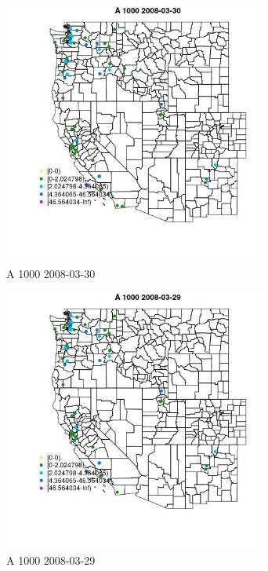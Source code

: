 \begin{figure} 
\centering  
\includegraphics[width=0.77\textwidth]{Code_Outputs/Report_ML_input_PM25_Step4_part_e_de_duplicated_aves_MapObsA_10002008-03-30.jpg} 
\caption{\label{fig:Report_ML_input_PM25_Step4_part_e_de_duplicated_avesMapObsA_10002008-03-30}A 1000 2008-03-30} 
\end{figure} 
 

\begin{figure} 
\centering  
\includegraphics[width=0.77\textwidth]{Code_Outputs/Report_ML_input_PM25_Step4_part_e_de_duplicated_aves_MapObsA_10002008-03-29.jpg} 
\caption{\label{fig:Report_ML_input_PM25_Step4_part_e_de_duplicated_avesMapObsA_10002008-03-29}A 1000 2008-03-29} 
\end{figure} 
 

